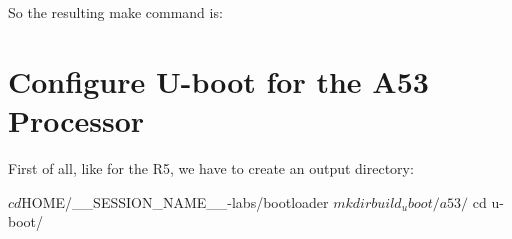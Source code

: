 So the resulting make command is:








\section{Configure U-boot for the A53 Processor}

First of all, like for the R5, we have to create an output directory:
\begin{bashinput}
$ cd $HOME/__SESSION_NAME__-labs/bootloader
$ mkdir build_uboot/a53/
$ cd u-boot/
\end{bashinput}

